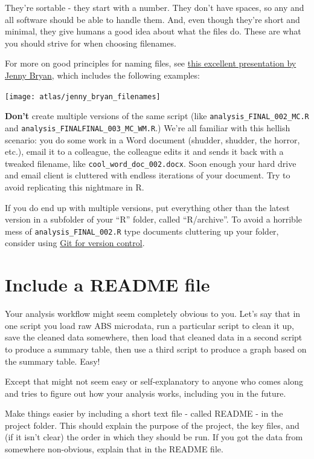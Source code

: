 \documentclass[
]{book}
\begin{document}
They're sortable - they start with a number. They don't have spaces, so any and all software should be able to handle them. And, even though they're short and minimal, they give humans a good idea about what the files do. These are what you should strive for when choosing filenames.

For more on good principles for naming files, see \href{https://speakerdeck.com/jennybc/how-to-name-files}{this excellent presentation by Jenny Bryan}, which includes the following examples:

\begin{center}\texttt{[image: atlas/jenny\_bryan\_filenames]} \end{center}

\textbf{Don't} create multiple versions of the same script (like \texttt{analysis\_FINAL\_002\_MC.R} and \texttt{analysis\_FINALFINAL\_003\_MC\_WM.R}.) We're all familiar with this hellish scenario: you do some work in a Word document (shudder, shudder, the horror, etc.), email it to a colleague, the colleague edits it and sends it back with a tweaked filename, like \texttt{cool\_word\_doc\_002.docx}. Soon enough your hard drive and email client is cluttered with endless iterations of your document. Try to avoid replicating this nightmare in R.

If you do end up with multiple versions, put everything other than the latest version in a subfolder of your ``R'' folder, called ``R/archive''. To avoid a horrible mess of \texttt{analysis\_FINAL\_002.R} type documents cluttering up your folder, consider using \protect\hyperlink{version-control}{Git for version control}.

\hypertarget{README}{%
\section{Include a README file}\label{README}}

Your analysis workflow might seem completely obvious to you. Let's say that in one script you load raw ABS microdata, run a particular script to clean it up, save the cleaned data somewhere, then load that cleaned data in a second script to produce a summary table, then use a third script to produce a graph based on the summary table. Easy!

Except that might not seem easy or self-explanatory to anyone who comes along and tries to figure out how your analysis works, including you in the future.

Make things easier by including a short text file - called README - in the project folder. This should explain the purpose of the project, the key files, and (if it isn't clear) the order in which they should be run. If you got the data from somewhere non-obvious, explain that in the README file.
\end{document}
